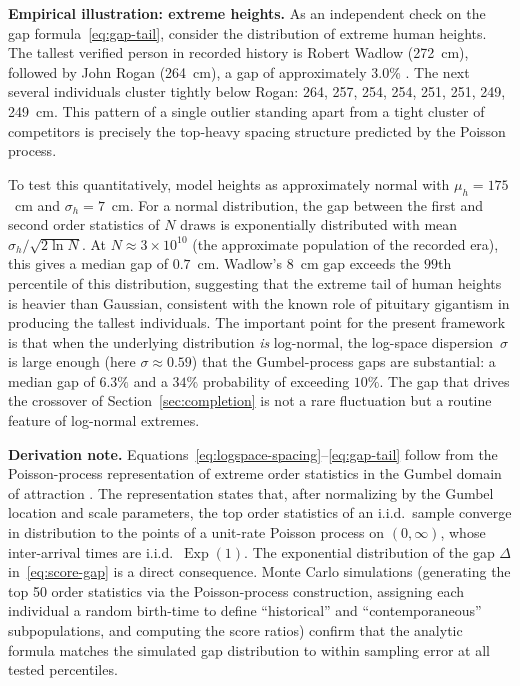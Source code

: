 \documentclass{article}
\begin{document}
\medskip
\noindent\textbf{Empirical illustration: extreme heights.}\;
As an independent check on the gap formula~\eqref{eq:gap-tail}, consider
the distribution of extreme human heights. The tallest verified person in
recorded history is Robert Wadlow (272~cm), followed by John Rogan
(264~cm), a gap of approximately $3.0\%$
\cite{guinness2024wadlow}. The next several individuals cluster tightly
below Rogan: 264, 257, 254, 254, 251, 251, 249, 249~cm. This
pattern of a single outlier standing apart from a tight cluster of
competitors is precisely the top-heavy spacing structure predicted by
the Poisson process.

To test this quantitatively, model heights as approximately
normal with $\mu_h = 175$~cm and $\sigma_h = 7$~cm. For a normal
distribution, the gap between the first and second order
statistics of $N$ draws is exponentially distributed with mean
$\sigma_h / \sqrt{2\ln N}$. At $N \approx 3 \times 10^{10}$
(the approximate population of the recorded era), this gives a
median gap of $0.7$~cm. Wadlow's $8$~cm gap exceeds the $99$th
percentile of this distribution, suggesting that the extreme tail
of human heights is heavier than Gaussian, consistent with the
known role of pituitary gigantism in producing the tallest
individuals. The important point for the present framework is that
when the underlying distribution \emph{is} log-normal, the
log-space dispersion~$\sigma$ is large enough (here $\sigma \approx
0.59$) that the Gumbel-process gaps are substantial: a median gap
of $6.3\%$ and a $34\%$ probability of exceeding $10\%$. The gap that
drives the crossover of Section~\ref{sec:completion} is not a
rare fluctuation but a routine feature of log-normal extremes.

\medskip
\noindent\textbf{Derivation note.}\;
Equations~\eqref{eq:logspace-spacing}--\eqref{eq:gap-tail} follow
from the Poisson-process representation of extreme order statistics
in the Gumbel domain of attraction
\cite{resnick1987,leadbetter1983}. The representation states that,
after normalizing by the Gumbel location and scale parameters, the
top order statistics of an i.i.d.\ sample converge in distribution
to the points of a unit-rate Poisson process on $(0,\infty)$, whose
inter-arrival times are i.i.d.\ $\operatorname{Exp}(1)$. The
exponential distribution of the gap $\Delta$ in~\eqref{eq:score-gap}
is a direct consequence. Monte Carlo simulations (generating the top
50 order statistics via the Poisson-process construction, assigning
each individual a random birth-time to define ``historical'' and
``contemporaneous'' subpopulations, and computing the score ratios)
confirm that the analytic formula matches the simulated gap
distribution to within sampling error at all tested percentiles.
\end{document}
